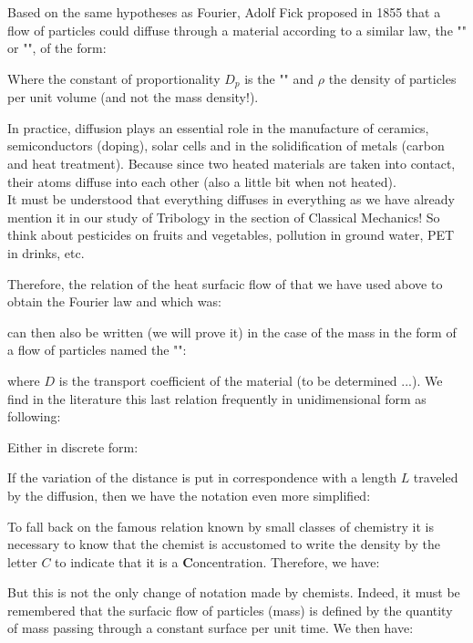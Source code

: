 	Based on the same hypotheses as Fourier,  Adolf Fick proposed in 1855 that a flow of particles could diffuse through a material according to a similar law, the "" or "", of the form:
	
	Where the constant of proportionality $D_p$ is the "" and $\rho$ the density of particles per unit volume (and not the mass density!).
	\begin{tcolorbox}[title=Remark,colframe=black,arc=10pt]
	In practice, diffusion plays an essential role in the manufacture of ceramics, semiconductors (doping), solar cells and in the solidification of metals (carbon and heat treatment). Because since two heated materials are taken into contact, their atoms diffuse into each other (also a little bit when not heated).\\

	It must be understood that everything diffuses in everything as we have already mention it in our study of Tribology in the section of Classical Mechanics! So think about pesticides on fruits and vegetables, pollution in ground water, PET in drinks, etc.
	\end{tcolorbox}
	Therefore, the relation of the heat surfacic flow of that we have used above to obtain the Fourier law and which was:
	
	can then also be written (we will prove it) in the case of the mass in the form of a flow of particles named the "":
	
	where $D$ is the transport coefficient of the material (to be determined ...). We find in the literature this last relation frequently in unidimensional form as following:
	
	Either in discrete form:
	
	If the variation of the distance is put in correspondence with a length $L$ traveled by  the diffusion, then we have the notation even more simplified:
	
	To fall back on the famous relation known by small classes of chemistry it is necessary to know that the chemist is accustomed to write the density by the letter $C$ to indicate that it is a \textbf{C}oncentration. Therefore, we have:
	
	But this is not the only change of notation made by chemists. Indeed, it must be remembered that the surfacic flow of particles (mass) is defined by the quantity of mass passing through a constant surface per unit time. We then have:
	
